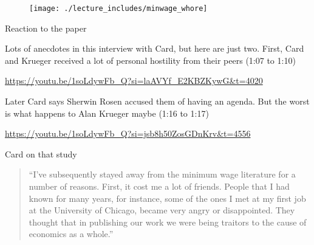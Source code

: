 \documentclass{beamer}
\begin{document}
\begin{frame}
	\begin{figure}
	\texttt{[image: ./lecture\_includes/minwage\_whore]}
	\end{figure}
\end{frame}


\begin{frame}{Reaction to the paper}


Lots of anecdotes in this interview with Card, but here are just two.  First, Card and Krueger received a lot of personal hostility from their peers (1:07 to 1:10)

\bigskip

\url{https://youtu.be/1soLdywFb_Q?si=laAVYf_E2KBZKywG&t=4020}

\bigskip

Later Card says Sherwin Rosen accused them of having an agenda.  But the worst is what happens to Alan Krueger maybe (1:16 to 1:17)

\bigskip

\url{https://youtu.be/1soLdywFb_Q?si=jsb8h50ZosGDnKrv&t=4556}




\end{frame}

\begin{frame}{Card on that study}

\begin{quote}
``I’ve subsequently stayed away from the minimum wage literature for a number of reasons. First, it cost me a lot of friends. People that I had known for many years, for instance, some of the ones I met at my first job at the University of Chicago, became very angry or disappointed. They thought that in publishing our work we were being traitors to the cause of economics as a whole.''
\end{quote}


\end{frame}
\end{document}
